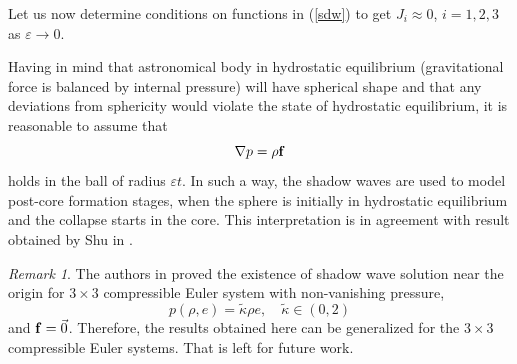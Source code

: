 \documentclass[reqno]{article}%
\theoremstyle{plain}
\theoremstyle{definition}
\theoremstyle{remark}
\newtheorem{remark}{Remark}[section]
\numberwithin{equation}{section}
\begin{document}
\medskip

Let us now determine conditions on functions in (\ref{sdw})  to get $J_i\approx 0$, $i=1,2,3$ as $\varepsilon\to 0$.   


Having in mind that astronomical body in hydrostatic equilibrium (gravitational force is balanced by internal pressure) will have spherical shape and that any deviations from sphericity would violate the state of hydrostatic equilibrium, it is reasonable to assume that 
\[\nabla p=\rho {\bf f}\]
holds in the ball of radius $\varepsilon t.$ In such a way, the shadow waves are used to model post-core formation stages, when the sphere is initially in hydrostatic equilibrium and the collapse starts in the core. This interpretation is in agreement with result obtained by Shu in \cite{shu}. 

\begin{remark}
The authors in \cite{mn_ober2018} proved the existence of shadow wave solution near the origin for $3\times 3$ compressible Euler system with non-vanishing pressure,
\[p(\rho,e)=\tilde{\kappa}\rho e,\quad \tilde{\kappa}\in(0,2)\]
and ${\bf f}=\vec{0}$.
Therefore, the results obtained here can be generalized for the $3\times 3$ compressible Euler systems. That is left for future work. 
\end{remark}
\end{document}
